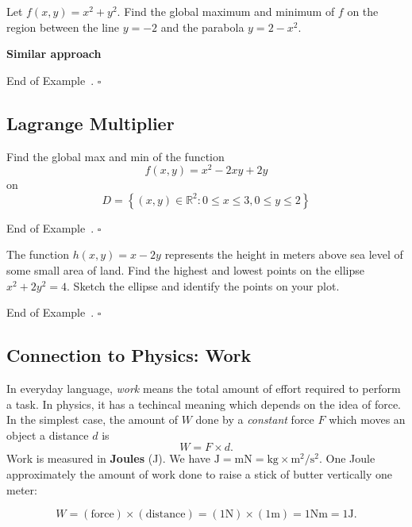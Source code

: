 \documentclass[10pt]{article}
\theoremstyle{definition}
\newtheorem{example}[theorem]{Example}
\renewenvironment{example}
{\begin{oldexample}}
  {\par\smallskip\hfill   End of Example~\theexample. $\square$    \par\end{oldexample}}
\newcommand{\fl}{\noindent\textbf} %
\newcommand{\1}[1]{\textbf{1}_{\left[#1\right]}} %
\def\R{\mathbb{R}} %
\newcommand{\dempfcolor}[1]{{\color{RoyalBlue}#1}}
\newcommand{\demph}[1]{\dempfcolor{{\sl #1}}}
\begin{document}
\begin{example}
  Let $f(x,y) = x^{2}+y^{2}$. Find the global maximum and minimum of $f$ on
  the region between the line $y=-2$ and the parabola $ y=2-x^{2}$.

  \fl{Similar approach}
\end{example}


\subsection{Lagrange Multiplier}


\begin{example}
  Find the global max and min of the function
  \begin{equation*}
    f(x,y) =x^{2}-2xy+2y
  \end{equation*}
  on
  \begin{equation*}
    D = \left\{(x,y)\in \R^{2}: 0 \leq x \leq 3, 0 \leq y \leq 2\right\}
  \end{equation*}
\end{example}

\begin{example}%
  The function $h(x,y) = x-2y$ represents the height in meters above sea level
  of some small area of land. Find the highest and lowest points on the
  ellipse $x^{2}+2y^{2}=4$. Sketch the ellipse and identify the points on your
  plot. 
\end{example}



\newpage

\subsection{Connection to Physics: Work}
In everyday language, \textit{work} means the total amount of effort required to perform a task. In
physics, it has a techincal meaning which depends on the idea of force. In the simplest case, the amount
of \demph{work} $W$ done by a \textit{constant} force $F$ which moves an object a distance $d$ is
\begin{equation*}
  W = F\times d.
\end{equation*}
Work is measured in \textbf{Joules} (J). We have
$\mathrm{J} = \mathrm{m N} = \mathrm{kg}\times \mathrm{m}^{2}/\mathrm{s}^{2}$. One Joule approximately the amount
of work done to raise a stick of butter vertically one meter:

\begin{equation*}
  W 
  = (\text{force})\times (\text{distance}) 
  = \left( 1\mathrm{N} \right)  \times \left( 1 \mathrm{m} \right) 
  = 1 \mathrm{N} \mathrm{m} 
  = 1 \mathrm{J}.
\end{equation*}
\end{document}

